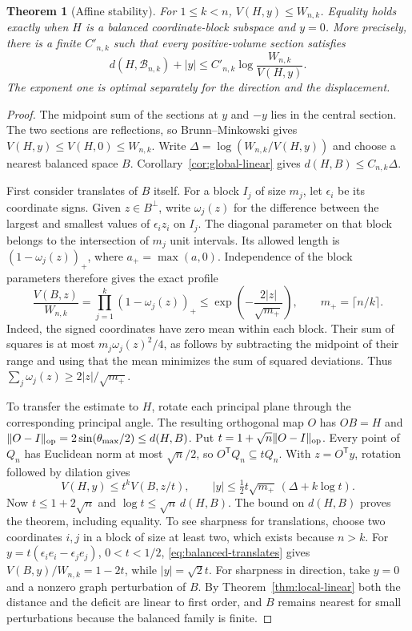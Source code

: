 \documentclass[11pt,a4paper]{article}
\newtheorem{theorem}{Theorem}[section]
\theoremstyle{remark}\newtheorem{remark}[theorem]{Remark}
\numberwithin{equation}{section}
\begin{document}
\begin{theorem}[Affine stability]\label{cor:affine-sections}
For \(1\le k<n\), \(V(H,y)\le W_{n,k}\). Equality holds exactly when
\(H\) is a balanced coordinate-block subspace and \(y=0\).
More precisely, there is a finite \(C'_{n,k}\) such that every
positive-volume section satisfies
\[
 d(H,\mathcal B_{n,k})+|y|
 \le C'_{n,k}\log\frac{W_{n,k}}{V(H,y)}.
\]
The exponent one is optimal separately for the direction and the displacement.
\end{theorem}
\begin{proof}
The midpoint sum of the sections at \(y\) and \(-y\) lies in the
central section. The two sections are reflections, so Brunn--Minkowski
gives \(V(H,y)\le V(H,0)\le W_{n,k}\). Write
\(\Delta=\log(W_{n,k}/V(H,y))\) and choose a nearest balanced space
\(B\). Corollary~\ref{cor:global-linear} gives \(d(H,B)\le C_{n,k}\Delta\).

First consider translates of \(B\) itself. For a block \(I_j\) of size
\(m_j\), let \(\epsilon_i\) be its coordinate signs. Given
\(z\in B^\perp\), write \(\omega_j(z)\) for the difference between the
largest and smallest values of \(\epsilon_i z_i\) on \(I_j\).
The diagonal parameter on that block belongs to the intersection of
\(m_j\) unit intervals. Its allowed length is
\((1-\omega_j(z))_+\), where \(a_+=\max(a,0)\).
Independence of the block parameters therefore gives the exact profile
\begin{equation}\label{eq:balanced-translates}
 \frac{V(B,z)}{W_{n,k}}=\prod_{j=1}^k(1-\omega_j(z))_+
 \le \exp\left(-\frac{2|z|}{\sqrt{m_+}}\right),
 \qquad m_+=\lceil n/k\rceil .
\end{equation}
Indeed, the signed coordinates have zero mean within each block.
Their sum of squares is at most \(m_j\omega_j(z)^2/4\), as follows by
subtracting the midpoint of their range and using that the mean minimizes
the sum of squared deviations. Thus
\(\sum_j\omega_j(z)\ge2|z|/\sqrt{m_+}\).

To transfer the estimate to \(H\), rotate each principal plane through
the corresponding principal angle. The resulting orthogonal map
\(O\) has \(OB=H\) and
\(\|O-I\|_{\rm op}=2\sin(\theta_{\max}/2)\le d(H,B)\).
Put \(t=1+\sqrt n\|O-I\|_{\rm op}\). Every point of \(Q_n\)
has Euclidean norm at most \(\sqrt n/2\), so \(O^{\mathsf T}Q_n\subseteq tQ_n\).
With \(z=O^{\mathsf T}y\), rotation followed by dilation gives
\[
 V(H,y)\le t^k V(B,z/t),\qquad
 |y|\le\tfrac12 t\sqrt{m_+}\,(\Delta+k\log t).
\]
Now \(t\le1+2\sqrt n\) and \(\log t\le\sqrt n\,d(H,B)\).
The bound on \(d(H,B)\) proves the theorem, including equality.
To see sharpness for translations, choose two coordinates \(i,j\) in a
block of size at least two, which exists because \(n>k\).
For \(y=t(\epsilon_i e_i-\epsilon_j e_j)\), \(0<t<1/2\),
\eqref{eq:balanced-translates} gives \(V(B,y)/W_{n,k}=1-2t\), while
\(|y|=\sqrt2t\). For sharpness in direction, take \(y=0\) and a nonzero
graph perturbation of \(B\). By Theorem~\ref{thm:local-linear} both the
distance and the deficit are linear to first order, and \(B\) remains
nearest for small perturbations because the balanced family is finite.
\end{proof}
\end{document}
